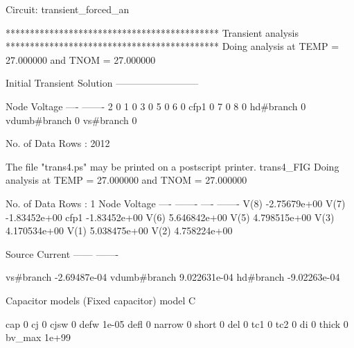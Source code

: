 
Circuit: transient_forced_an

********************************************
Transient analysis
********************************************
Doing analysis at TEMP = 27.000000 and TNOM = 27.000000


Initial Transient Solution
--------------------------

Node                                   Voltage
----                                   -------
2                                            0
1                                            0
3                                            0
5                                            0
6                                            0
cfp1                                         0
7                                            0
8                                            0
hd#branch                                    0
vdumb#branch                                 0
vs#branch                                    0


No. of Data Rows : 2012

The file "trans4.ps" may be printed on a postscript printer.
trans4_FIG
Doing analysis at TEMP = 27.000000 and TNOM = 27.000000


No. of Data Rows : 1
	Node                                  Voltage
	----                                  -------
	----	-------
	V(8)                             -2.75679e+00
	V(7)                             -1.83452e+00
	cfp1                             -1.83452e+00
	V(6)                             5.646842e+00
	V(5)                             4.798515e+00
	V(3)                             4.170534e+00
	V(1)                             5.038475e+00
	V(2)                             4.758224e+00

	Source	Current
	------	-------

	vs#branch                        -2.69487e-04
	vdumb#branch                     9.022631e-04
	hd#branch                        -9.02263e-04

 Capacitor models (Fixed capacitor)
      model                     C

        cap                     0
         cj                     0
       cjsw                     0
       defw                 1e-05
       defl                     0
     narrow                     0
      short                     0
        del                     0
        tc1                     0
        tc2                     0
         di                     0
      thick                     0
     bv_max                 1e+99

